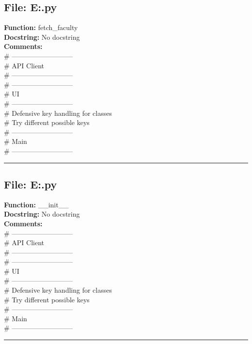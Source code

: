 {\subsection*{File: E:\project\capstone\frontend\faculty\attendence.py}
\textbf{Function:} fetch_faculty\\
\textbf{Docstring:} No docstring\\
\textbf{Comments:}\\
# ---------------------------\\
# API Client\\
# ---------------------------\\
# ---------------------------\\
# UI\\
# ---------------------------\\
# Defensive key handling for classes\\
# Try different possible keys\\
# ---------------------------\\
# Main\\
# ---------------------------\\

\hrule

\subsection*{File: E:\project\capstone\frontend\faculty\attendence.py}
\textbf{Function:} __init__\\
\textbf{Docstring:} No docstring\\
\textbf{Comments:}\\
# ---------------------------\\
# API Client\\
# ---------------------------\\
# ---------------------------\\
# UI\\
# ---------------------------\\
# Defensive key handling for classes\\
# Try different possible keys\\
# ---------------------------\\
# Main\\
# ---------------------------\\

\hrule

}
